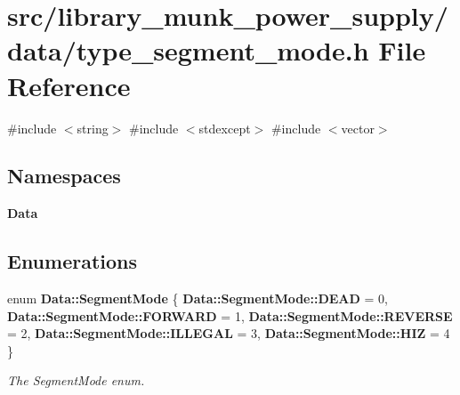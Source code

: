 \section{src/library\+\_\+munk\+\_\+power\+\_\+supply/data/type\+\_\+segment\+\_\+mode.h File Reference}
\label{type__segment__mode_8h}
{\ttfamily \#include $<$string$>$}\newline
{\ttfamily \#include $<$stdexcept$>$}\newline
{\ttfamily \#include $<$vector$>$}\newline
\subsection*{Namespaces}
\begin{DoxyCompactItemize}
\item 
 \textbf{ Data}
\end{DoxyCompactItemize}
\subsection*{Enumerations}
\begin{DoxyCompactItemize}
\item 
enum \textbf{ Data\+::\+Segment\+Mode} \{ \newline
\textbf{ Data\+::\+Segment\+Mode\+::\+D\+E\+AD} = 0, 
\textbf{ Data\+::\+Segment\+Mode\+::\+F\+O\+R\+W\+A\+RD} = 1, 
\textbf{ Data\+::\+Segment\+Mode\+::\+R\+E\+V\+E\+R\+SE} = 2, 
\textbf{ Data\+::\+Segment\+Mode\+::\+I\+L\+L\+E\+G\+AL} = 3, 
\newline
\textbf{ Data\+::\+Segment\+Mode\+::\+H\+IZ} = 4
 \}\begin{DoxyCompactList}\small\item\em The Segment\+Mode enum. \end{DoxyCompactList}
\end{DoxyCompactItemize}
